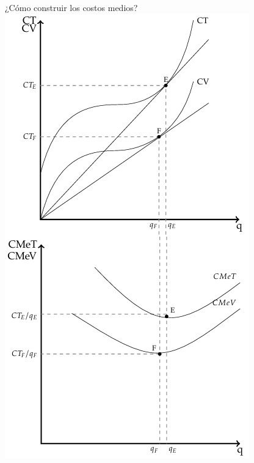 \documentclass{beamer}
\begin{document}
\begin{frame}{¿Cómo construir los costos medios?}
\centering
\includegraphics[scale=0.5]{../Figures/C13.6.png}
\end{frame}
\end{document}
